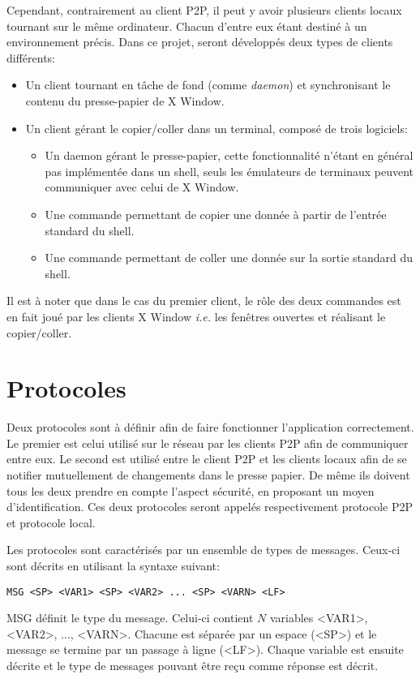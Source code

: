 Cependant, contrairement au client P2P, il peut y avoir plusieurs clients
locaux tournant sur le même ordinateur. Chacun d'entre eux étant destiné
à un environnement précis. Dans ce projet, seront développés deux types
de clients différents:
\begin{itemize}
\item Un client tournant en tâche de fond (comme \emph{daemon}) et
  synchronisant le contenu du presse-papier de X Window.
\item Un client gérant le copier/coller dans un terminal, composé de trois
  logiciels:
  \begin{itemize}
  \item Un daemon gérant le presse-papier, cette fonctionnalité n'étant en
    général pas implémentée dans un shell, seuls les émulateurs de terminaux
    peuvent communiquer avec celui de X Window.
  \item Une commande permettant de copier une donnée à partir de l'entrée
    standard du shell.
  \item Une commande permettant de coller une donnée sur la sortie standard
    du shell.
  \end{itemize}
\end{itemize}
Il est à noter que dans le cas du premier client, le rôle des deux commandes
est en fait joué par les clients X Window \emph{i.e.} les fenêtres ouvertes
et réalisant le copier/coller.

\section{Protocoles}
Deux protocoles sont à définir afin de faire fonctionner l'application
correctement. Le premier est celui utilisé sur le réseau par les clients
P2P afin de communiquer entre eux. Le second est utilisé entre le client
P2P et les clients locaux afin de se notifier mutuellement de changements
dans le presse papier. De même ils doivent tous les deux prendre en compte
l'aspect sécurité, en proposant un moyen d'identification.
Ces deux protocoles seront appelés respectivement protocole P2P et protocole
local.

Les protocoles sont caractérisés par un ensemble de types de messages.
Ceux-ci sont décrits en utilisant la syntaxe suivant:
\begin{verbatim}
MSG <SP> <VAR1> <SP> <VAR2> ... <SP> <VARN> <LF>
\end{verbatim}
MSG définit le type du message. Celui-ci contient $N$ variables
<VAR1>, <VAR2>, $\ldots$, <VARN>. Chacune est séparée par un espace (<SP>)
et le message se termine par un passage à ligne (<LF>). Chaque variable est
ensuite décrite et le type de messages pouvant être reçu comme réponse est
décrit.

